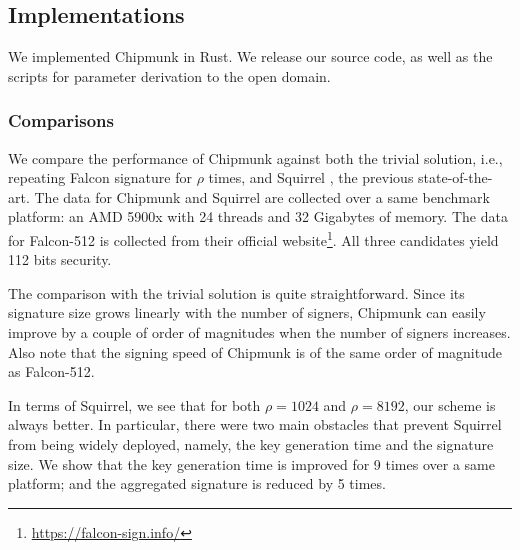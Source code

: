 \subsection{Implementations}
We implemented Chipmunk in Rust. We release our source code, as well as the scripts for parameter derivation to the open domain.

\subsubsection{Comparisons}\label{ss:comparison}

We compare the performance of Chipmunk against both the trivial solution, i.e., repeating Falcon signature for $\rho$ times, and
Squirrel \cite{CCS:FleSimZha22}, the previous state-of-the-art. The data for Chipmunk and Squirrel are collected over a same benchmark platform: an AMD 5900x with 24 threads
and 32 Gigabytes of memory. The data for Falcon-512 is collected from their official website\footnote{\url{https://falcon-sign.info/}}.
All three candidates yield 112 bits security.

The comparison with the trivial solution is quite straightforward. Since its signature size grows linearly with the number of signers,
Chipmunk can easily improve by a couple of order of magnitudes when the number of signers increases.
Also note that the signing speed of Chipmunk is of the same order of magnitude as Falcon-512.

In terms of Squirrel, we see that for both $\rho = 1024$ and $\rho = 8192$, our scheme is always better. 
In particular, there were two main obstacles that prevent Squirrel from being widely deployed, namely, the key generation time
and the signature size. We show that the key generation time is improved for 9 times over a same platform; and the 
aggregated signature is reduced by 5 times. 

